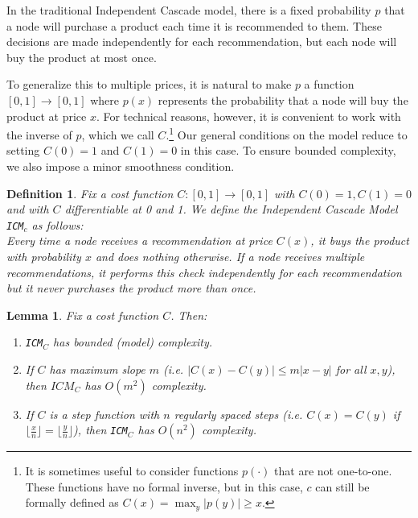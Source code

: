 \documentclass[letterpaper,twoside]{article}
\newtheorem{lemma}{Lemma}
\newtheorem{defn}{Definition}
\newcommand{\ICM}[1]{\texttt{ICM}$_{#1}$}
\begin{document}
In the traditional Independent Cascade model, there is a fixed
probability $p$ that a node will purchase a product each time it is
recommended to them. These decisions are made independently for each
recommendation, but each node will buy the product at most once.

To generalize this to multiple prices, it is natural to make $p$ a
function $[0,1]\rightarrow[0,1]$ where $p(x)$ represents the
probability that a node will buy the product at price $x$. For
technical reasons, however, it is convenient to work with the
inverse of $p$, which we call $C$.\footnote{It is sometimes useful
to consider functions $p(\cdot)$ that are not one-to-one. These functions have
no formal inverse, but in this case, $c$ can still be formally defined as
$C(x) = \max_y | p(y) | \ge x$.} Our general conditions on the
model reduce to setting $C(0) = 1$ and $C(1) = 0$ in this case. To ensure
bounded complexity, we also impose a minor smoothness condition.
\begin{defn}
    Fix a cost function $C: [0,1]\rightarrow[0,1]$ with
    $C(0) = 1, C(1) = 0$ and with $C$ differentiable at 0 and 1.
    We define the {\em Independent Cascade Model} \ICM{c} as follows:\\
    Every time a node receives a recommendation at price $C(x)$, it
    buys the product with probability $x$ and does nothing
    otherwise. If a node receives multiple recommendations, it
    performs this check independently for each recommendation but
    it never purchases the product more than once.
\end{defn}

\begin{lemma} \label{ICMLem}
    Fix a cost function $C$. Then:
    \begin{enumerate}
      \item \ICM{C} has bounded (model) complexity.
      \item If $C$ has maximum slope $m$ (i.e.
        $|C(x) - C(y)| \leq m|x-y|$ for all $x,y$), then $ICM_C$ has $O(m^2)$
        complexity.
      \item If $C$ is a step function with $n$ regularly spaced
            steps (i.e. $C(x) = C(y)$ if $\lfloor \frac{x}{n}
            \rfloor = \lfloor \frac{y}{n} \rfloor$), then \ICM{C}
            has $O(n^2)$ complexity.
    \end{enumerate}
\end{lemma}
\end{document}
